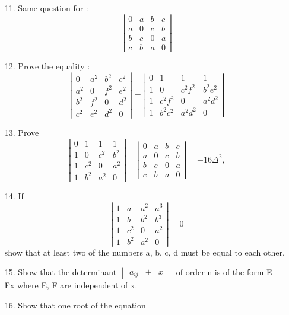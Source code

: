 \documentclass[11pt]{amsbook}
\begin{document}
	\begin{enumerate}
		\item[11.]
		Same question for :
		\[ \left|
	     \begin{array}{cccc}
	        0 & a & b & c\\
	        a & 0 & c & b\\
	        b & c & 0 & a\\
	        c & b & a & 0
		\end{array}
    	\right| \]

    	\item[12.]
    	Prove the equality :
    	\[ \left| \begin{array}{llll}
	        0 & a^2 & b^2 & c^2\\
	        a^2 & 0 & f^2 & e^2\\  
	        b^2 & f^2 & 0 & d^2\\
	        c^2 & e^2 & d^2 & 0
    	\end{array} \right|
    	=
    	\left| \begin{array}{cccc}
	        0 & 1 & 1 & 1\\
	        1 & 0 & c^2f^2 & b^2e^2\\
	        1 & c^2f^2 & 0 & a^2d^2\\
	        1 & b^2c^2 & a^2d^2 & 0
    	\end{array} \right| \] 

    	\item[13.]
    	Prove
    	\[ \left| \begin{array}{llll}
	        0 & 1 & 1 & 1\\
	        1 & 0 & c^2 & b^2\\  
	        1 & c^2 & 0 & a^2\\
	        1 & b^2 & a^2 & 0
	    \end{array} \right|
	    =
	    \left| \begin{array}{cccc}
	        0 & a & b & c\\
	        a & 0 & c & b\\  
	        b & c & 0 & a\\
	        c & b & a & 0
    	\end{array} \right|
    	=
    	-16\Delta^2,
		\]
    	
		\item[14.]
		If
		\[ \left| \begin{array}{cccc}
	        1 & a & a^2 & a^3\\
	        1 & b & b^2 & b^3\\  
	        1 & c^2 & 0 & a^2\\
	        1 & b^2 & a^2 & 0
   		 \end{array} \right|
    		=
    		0 
    	\] 
     	show that at least two of the numbers a, b, c, d must be equal to each other.

    	\item[15.]
    	Show that the determinant
    	$\begin{vmatrix}
		a_{ij} & + & x 
		\end{vmatrix}$
		of order n is of the form E + Fx where E, F are independent of x.

		\item[16.]
		Show that one root of the equation
	\end{enumerate}
\end{document}
